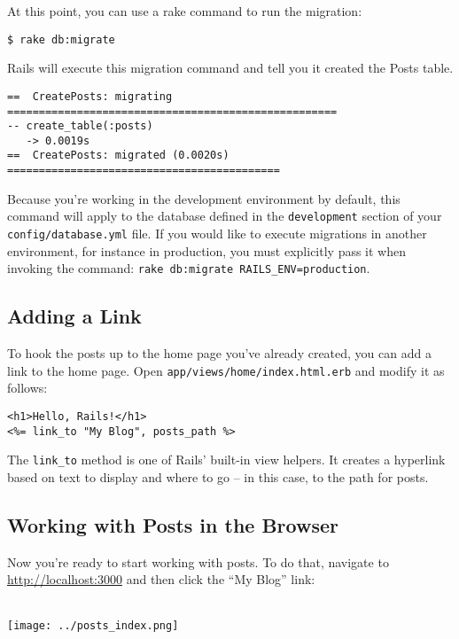 \documentclass[10pt]{book}
\begin{document}
At this point, you can use a rake command to run the migration:


\begin{verbatim}
$ rake db:migrate
\end{verbatim}

Rails will execute this migration command and tell you it created the Posts table.


\begin{verbatim}
==  CreatePosts: migrating ====================================================
-- create_table(:posts)
   -> 0.0019s
==  CreatePosts: migrated (0.0020s) ===========================================
\end{verbatim}

Because you’re working in the development environment by default, this command will apply to the database defined in the \texttt{development} section of your \texttt{config/database.yml} file. If you would like to execute migrations in another environment, for instance in production, you must explicitly pass it when invoking the command: \texttt{rake db:migrate RAILS\_ENV=production}.

\subsection{ Adding a Link}

To hook the posts up to the home page you’ve already created, you can add a link to the home page. Open \texttt{app/views/home/index.html.erb} and modify it as follows:


\begin{verbatim}
<h1>Hello, Rails!</h1>
<%= link_to "My Blog", posts_path %>
\end{verbatim}

The \texttt{link\_to} method is one of Rails’ built-in view helpers. It creates a hyperlink based on text to display and where to go – in this case, to the path for posts.

\subsection{ Working with Posts in the Browser}

Now you’re ready to start working with posts. To do that, navigate to \href{http://localhost:3000/}{http://localhost:3000} and then click the “My Blog” link:

\\
\texttt{[image: ../posts\_index.png]}
\\
\end{document}
